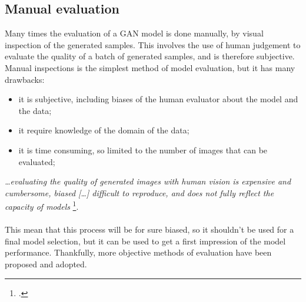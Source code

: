 \subsection{Manual evaluation}
\label{subsec:manual-evaluation}
Many times the evaluation of a GAN model is done manually, by visual inspection of the generated samples.
This involves the use of human judgement to evaluate the quality of a batch of generated samples, and is therefore subjective.
Manual inspections is the simplest method of model evaluation, but it has many drawbacks:
\begin{itemize}
    \item it is subjective, including biases of the human evaluator about the model and the data;
    \item it require knowledge of the domain of the data;
    \item it is time consuming, so limited to the number of images that can be evaluated;
\end{itemize}
\emph{…evaluating the quality of generated images with human vision is expensive and cumbersome, biased […] difficult to reproduce, and does not fully reflect the capacity of models}
\footcite{paper:ganeval}.\\\\
This mean that this process will be for sure biased, so it shouldn't be used for a final model selection,
 but it can be used to get a first impression of the model performance.
Thankfully, more objective methods of evaluation have been proposed and adopted.
